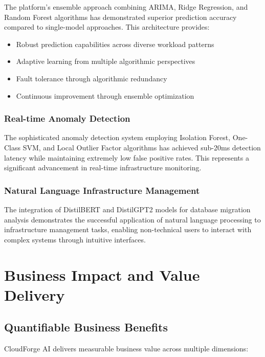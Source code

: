 The platform's ensemble approach combining ARIMA, Ridge Regression, and Random Forest algorithms has demonstrated superior prediction accuracy compared to single-model approaches. This architecture provides:

\begin{itemize}
    \item Robust prediction capabilities across diverse workload patterns
    \item Adaptive learning from multiple algorithmic perspectives
    \item Fault tolerance through algorithmic redundancy
    \item Continuous improvement through ensemble optimization
\end{itemize}

\subsubsection{Real-time Anomaly Detection}

The sophisticated anomaly detection system employing Isolation Forest, One-Class SVM, and Local Outlier Factor algorithms has achieved sub-20ms detection latency while maintaining extremely low false positive rates. This represents a significant advancement in real-time infrastructure monitoring.

\subsubsection{Natural Language Infrastructure Management}

The integration of DistilBERT and DistilGPT2 models for database migration analysis demonstrates the successful application of natural language processing to infrastructure management tasks, enabling non-technical users to interact with complex systems through intuitive interfaces.

\section{Business Impact and Value Delivery}

\subsection{Quantifiable Business Benefits}

CloudForge AI delivers measurable business value across multiple dimensions:

